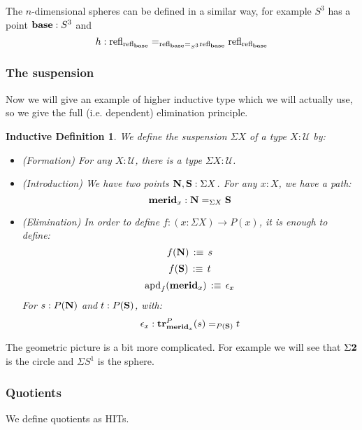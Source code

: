 \documentclass{article}
\newcommand{\ssse}[1]{\subsubsection*{#1}}
\newcommand{\U}{{\mathcal U}}
\renewcommand{\r}{\rightarrow}
\newcommand{\apd}{\mathrm{apd}}
\newcommand{\refl}{\mathrm{refl}}
\newcommand{\tr}{\mathrm{\bf tr}}
\newcommand{\base}{\mathrm{\bf base}}
\newcommand{\N}{\mathrm{\bf N}}
\renewcommand{\S}{\mathrm{\bf S}}
\newcommand{\merid}{\mathrm{\bf merid}}
\newcommand{\two}{{\bf 2}}
\newtheorem{remark}{Remark}
\newtheorem{ind_def}{Inductive Definition}
\begin{document}
The $n$-dimensional spheres can be defined in a similar way, for example $S^3$ has a point $\base:S^3$ and 
\[h:\refl_{\refl_\base} =_{\refl_\base =_{S^3}\refl_\base} \refl_{\refl_\base}\]



\ssse{The suspension}

Now we will give an example of higher inductive type which we will actually use, so we give the full (i.e. dependent) elimination principle.

\begin{ind_def}
We define the suspension $\Sigma X$ of a type $X:\U$ by:
\begin{itemize}
\item (Formation) For any $X:\U$, there is a type $\Sigma X : \U$.
\item (Introduction) We have two points $\N,\S : \Sigma X$. For any $x:X$, we have a path:
\[\merid_x : \N=_{\Sigma X}\S\]
\item (Elimination) In order to define $f:(x:\Sigma X)\r P(x)$, it is enough to define:
\[f(\N) \, :\equiv\, s\]
\[f(\S)\, :\equiv\, t\]
\[\apd_f(\merid_x) \, :\equiv\, \epsilon_x\]
For $s:P(\N)$ and $t:P(\S)$, with:
\[\epsilon_x : \tr^P_{\merid_x}(s) =_{P(\S)} t\] 
\end{itemize}
\end{ind_def}

The geometric picture is a bit more complicated. For example we will see that $\Sigma \two$ is the circle and $\Sigma S^1$ is the sphere.






\ssse{Quotients}

We define quotients as HITs. 
\end{document}
